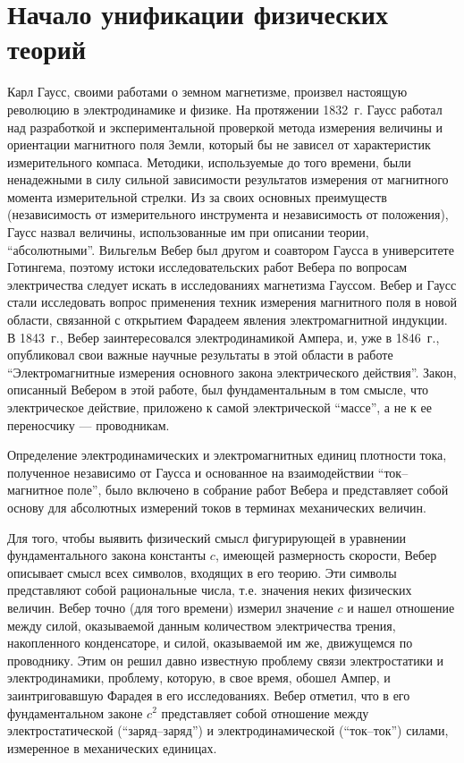 \documentclass[12pt, oneside, a4paper]{article}
\begin{document}
\section{Начало унификации физических теорий}
Карл Гаусс, своими работами о земном магнетизме, произвел настоящую революцию в электродинамике и физике.  На протяжении 1832~г. Гаусс работал над разработкой и экспериментальной проверкой метода измерения величины и ориентации магнитного поля Земли, который бы не зависел от характеристик измерительного компаса. Методики, используемые до того времени, были ненадежными в силу сильной зависимости результатов измерения от магнитного момента измерительной стрелки. Из за своих основных преимуществ (независимость от измерительного инструмента и независимость от положения), Гаусс назвал величины, использованные им при описании теории, ``абсолютными''. Вильгельм Вебер  был другом и соавтором Гаусса в университете Готингема, поэтому истоки исследовательских работ Вебера по вопросам электричества следует искать в исследованиях магнетизма Гауссом. Вебер и Гаусс стали исследовать вопрос применения техник измерения магнитного поля в новой области, связанной с открытием Фарадеем явления электромагнитной индукции. В 1843~г., Вебер заинтересовался электродинамикой Ампера, и, уже в 1846~г., опубликовал свои важные научные результаты в этой области в работе ``Электромагнитные измерения основного закона электрического действия''. Закон, описанный Вебером в этой работе, был фундаментальным в том смысле, что электрическое действие, приложено к самой электрической ``массе'', а не к ее переносчику --- проводникам. 

Определение электродинамических и электромагнитных единиц плотности тока, полученное независимо от Гаусса и основанное на взаимодействии ``ток--магнитное поле'', было включено в собрание работ Вебера и представляет собой основу для абсолютных измерений токов в терминах механических величин.

Для того, чтобы выявить физический смысл фигурирующей в уравнении фундаментального закона константы $c$, имеющей размерность скорости, Вебер описывает смысл всех символов, входящих в его теорию. Эти символы представляют собой рациональные числа, т.е. значения неких физических величин. Вебер точно (для того времени) измерил значение $c$ и нашел отношение между силой, оказываемой данным количеством электричества трения, накопленного  конденсаторе, и силой, оказываемой им же, движущемся по проводнику. Этим он решил давно известную проблему связи электростатики и электродинамики, проблему, которую, в свое время, обошел Ампер, и заинтриговавшую Фарадея в его исследованиях. Вебер отметил, что в его фундаментальном законе $c^2$ представляет собой отношение между электростатической (``заряд--заряд'') и электродинамической (``ток--ток'') силами, измеренное в механических единицах.
\end{document}
